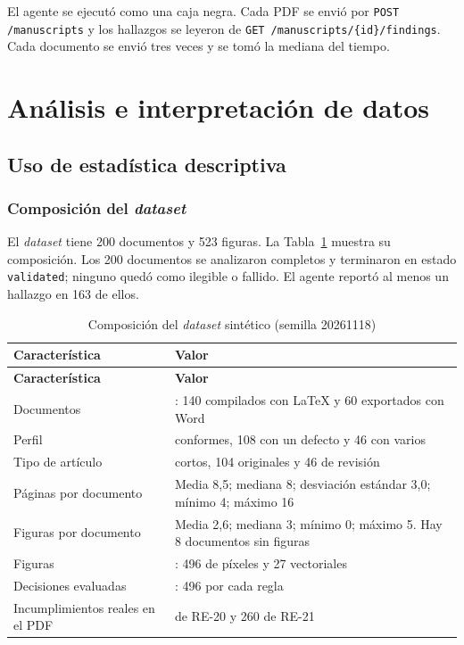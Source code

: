El agente se ejecutó como una caja negra. Cada PDF se envió por \texttt{POST /manuscripts} y los hallazgos se leyeron de \texttt{GET /manuscripts/\{id\}/findings}. Cada documento se envió tres veces y se tomó la mediana del tiempo.

\section{Análisis e interpretación de datos}

\subsection{Uso de estadística descriptiva}

\subsubsection*{Composición del \emph{dataset}}

El \emph{dataset} tiene 200 documentos y 523 figuras. La Tabla~\ref{tab:4-2} muestra su composición. Los 200 documentos se analizaron completos y terminaron en estado \texttt{validated}; ninguno quedó como ilegible o fallido. El agente reportó al menos un hallazgo en 163 de ellos.

{\small
\begin{longtable}{@{}>{\raggedright\arraybackslash}p{}>{\raggedright\arraybackslash}p{}@{}}
\caption{Composición del \emph{dataset} sintético (semilla 20261118)}\label{tab:4-2}\\
\toprule
\textbf{Característica} & \textbf{Valor} \\
\midrule
\endfirsthead
\toprule
\textbf{Característica} & \textbf{Valor} \\
\midrule
\endhead
\bottomrule
\endfoot
\endlastfoot
Documentos & 200: 140 compilados con LaTeX y 60 exportados con Word \\
Perfil & 46 conformes, 108 con un defecto y 46 con varios \\
Tipo de artículo & 50 cortos, 104 originales y 46 de revisión \\
Páginas por documento & Media 8,5; mediana 8; desviación estándar 3,0; mínimo 4; máximo 16 \\
Figuras por documento & Media 2,6; mediana 3; mínimo 0; máximo 5. Hay 8 documentos sin figuras \\
Figuras & 523: 496 de píxeles y 27 vectoriales \\
Decisiones evaluadas & 992: 496 por cada regla \\
Incumplimientos reales en el PDF & 238 de RE-20 y 260 de RE-21 \\
\end{longtable}
}

